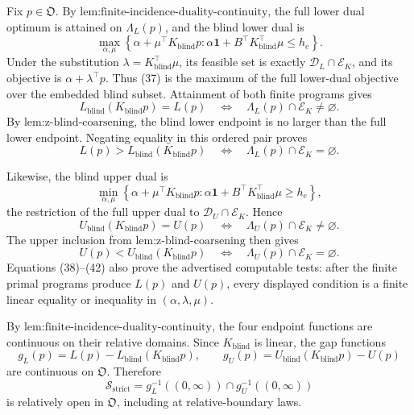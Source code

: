 Fix \(p\in\mathfrak O\).  By \(\text{lem:finite-incidence-duality-continuity}\), the full lower dual optimum is attained on \(\Lambda_L(p)\), and the blind lower dual is
\[
\max_{\alpha,\mu}\left\{\alpha+\mu^{\top}K_{\mathrm{blind}}p:
\alpha\mathbf 1+B^{\top}K_{\mathrm{blind}}^{\top}\mu\leq h_e\right\}.
\tag{37}
\]
Under the substitution \(\lambda=K_{\mathrm{blind}}^{\top}\mu\), its feasible set is exactly \(\mathcal D_L\cap\mathcal E_K\), and its objective is \(\alpha+\lambda^{\top}p\).  Thus (37) is the maximum of the full lower-dual objective over the embedded blind subset.  Attainment of both finite programs gives
\[
L_{\mathrm{blind}}(K_{\mathrm{blind}}p)=L(p)
\quad\Longleftrightarrow\quad
\Lambda_L(p)\cap\mathcal E_K\neq\varnothing.
\tag{38}
\]
By \(\text{lem:z-blind-coarsening}\), the blind lower endpoint is no larger than the full lower endpoint.  Negating equality in this ordered pair proves
\[
L(p)>L_{\mathrm{blind}}(K_{\mathrm{blind}}p)
\quad\Longleftrightarrow\quad
\Lambda_L(p)\cap\mathcal E_K=\varnothing.
\tag{39}
\]

Likewise, the blind upper dual is
\[
\min_{\alpha,\mu}\left\{\alpha+\mu^{\top}K_{\mathrm{blind}}p:
\alpha\mathbf 1+B^{\top}K_{\mathrm{blind}}^{\top}\mu\geq h_e\right\},
\tag{40}
\]
the restriction of the full upper dual to \(\mathcal D_U\cap\mathcal E_K\).  Hence
\[
U_{\mathrm{blind}}(K_{\mathrm{blind}}p)=U(p)
\quad\Longleftrightarrow\quad
\Lambda_U(p)\cap\mathcal E_K\neq\varnothing.
\tag{41}
\]
The upper inclusion from \(\text{lem:z-blind-coarsening}\) then gives
\[
U(p)<U_{\mathrm{blind}}(K_{\mathrm{blind}}p)
\quad\Longleftrightarrow\quad
\Lambda_U(p)\cap\mathcal E_K=\varnothing.
\tag{42}
\]
Equations (38)--(42) also prove the advertised computable tests: after the finite primal programs produce \(L(p)\) and \(U(p)\), every displayed condition is a finite linear equality or inequality in \((\alpha,\lambda,\mu)\).

By \(\text{lem:finite-incidence-duality-continuity}\), the four endpoint functions are continuous on their relative domains.  Since \(K_{\mathrm{blind}}\) is linear, the gap functions
\[
g_L(p)=L(p)-L_{\mathrm{blind}}(K_{\mathrm{blind}}p),
\qquad
g_U(p)=U_{\mathrm{blind}}(K_{\mathrm{blind}}p)-U(p)
\tag{43}
\]
are continuous on \(\mathfrak O\).  Therefore
\[
\mathcal S_{\mathrm{strict}}
=g_L^{-1}((0,\infty))\cap g_U^{-1}((0,\infty))
\tag{44}
\]
is relatively open in \(\mathfrak O\), including at relative-boundary laws.

